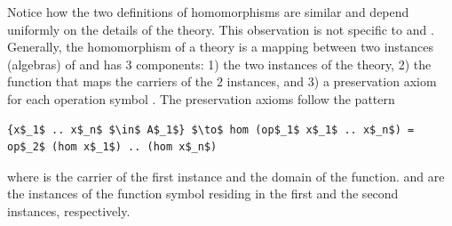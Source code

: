 Notice how the two definitions of homomorphisms are similar and depend uniformly on the details of the theory. This observation is not specific to  and . Generally, the homomorphism of a theory \lstmath{$\Gamma$} is a mapping between two instances (algebras) of \lstmath{$\Gamma$} and has $3$ components: 1) the two instances of the theory, 2) the function  that maps the carriers of the $2$ instances, and 3) a preservation axiom  for each operation symbol . The preservation axioms follow the pattern
\begin{lstlisting}[mathescape]
{x$_1$ .. x$_n$ $\in$ A$_1$} $\to$ hom (op$_1$ x$_1$ .. x$_n$) = op$_2$ (hom x$_1$) .. (hom x$_n$)
\end{lstlisting}
where  is the carrier of the first instance and the domain of the  function.  and  are the instances of the function symbol  residing in the first and the second instances, respectively. 

